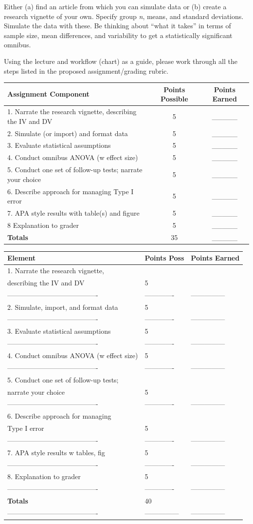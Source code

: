 \documentclass[
  english,
]{book}
\begin{document}
Either (a) find an article from which you can simulate data or (b) create a research vignette of your own. Specify group \emph{n}, means, and standard deviations. Simulate the data with these. Be thinking about ``what it takes'' in terms of sample size, mean differences, and variability to get a statistically significant omnibus.

Using the lecture and workflow (chart) as a guide, please work through all the steps listed in the proposed assignment/grading rubric.

\begin{longtable}[]{@{}lcc@{}}
\toprule
Assignment Component & Points Possible & Points Earned\tabularnewline
\midrule
\endhead
1. Narrate the research vignette, describing the IV and DV & 5 & \_\_\_\_\_\tabularnewline
2. Simulate (or import) and format data & 5 & \_\_\_\_\_\tabularnewline
3. Evaluate statistical assumptions & 5 & \_\_\_\_\_\tabularnewline
4. Conduct omnibus ANOVA (w effect size) & 5 & \_\_\_\_\_\tabularnewline
5. Conduct one set of follow-up tests; narrate your choice & 5 & \_\_\_\_\_\tabularnewline
6. Describe approach for managing Type I error & 5 & \_\_\_\_\_\tabularnewline
7. APA style results with table(s) and figure & 5 & \_\_\_\_\_\tabularnewline
8 Explanation to grader & 5 & \_\_\_\_\_\tabularnewline
\textbf{Totals} & 35 & \_\_\_\_\_\tabularnewline
\bottomrule
\end{longtable}

\begin{longtable}[]{@{}lll@{}}
\toprule
Element & Points Poss & Points Earned\tabularnewline
\midrule
\endhead
1. Narrate the research vignette, & &\tabularnewline
describing the IV and DV & 5 &\tabularnewline
---------------------------------------- & ------------- & ---------------\tabularnewline
2. Simulate, import, and format data & 5 &\tabularnewline
---------------------------------------- & ------------- & ---------------\tabularnewline
3. Evaluate statistical assumptions & 5 &\tabularnewline
---------------------------------------- & ------------- & ---------------\tabularnewline
4. Conduct omnibus ANOVA (w effect size) & 5 &\tabularnewline
---------------------------------------- & ------------- & ---------------\tabularnewline
5. Conduct one set of follow-up tests; & &\tabularnewline
narrate your choice & 5 &\tabularnewline
---------------------------------------- & ------------- & ---------------\tabularnewline
6. Describe approach for managing & &\tabularnewline
Type I error & 5 &\tabularnewline
---------------------------------------- & ------------- & ---------------\tabularnewline
7. APA style results w tables, fig & 5 &\tabularnewline
---------------------------------------- & ------------- & ---------------\tabularnewline
8. Explanation to grader & 5 &\tabularnewline
---------------------------------------- & ------------- & ---------------\tabularnewline
\textbf{Totals} & 40 &\tabularnewline
---------------------------------------- & --------------- & ---------------\tabularnewline
\bottomrule
\end{longtable}
\end{document}
